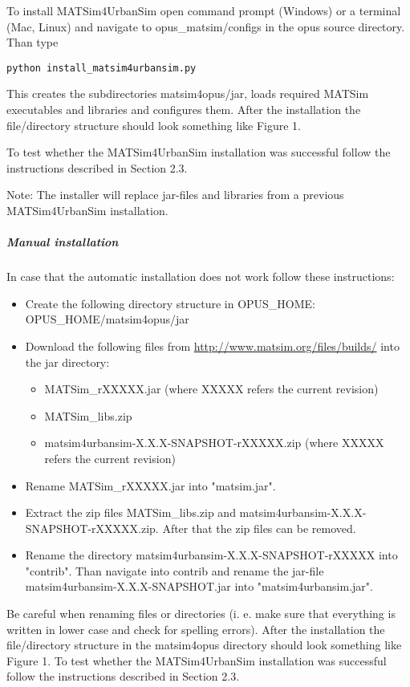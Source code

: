 To install MATSim4UrbanSim open command prompt (Windows) or a  terminal (Mac, Linux) and navigate to opus\_matsim/configs in the opus  source directory. Than type


\texttt{python install\_matsim4urbansim.py}

This creates the subdirectories matsim4opus/jar, loads required  MATSim executables and libraries and configures them. After the  installation the file/directory structure should look something like  Figure 1.

To test whether the MATSim4UrbanSim installation was successful follow the instructions described in Section 2.3.

Note: The installer will replace jar-files and libraries from a previous MATSim4UrbanSim installation.

\subparagraph{Manual installation}

In case that the automatic installation does not work follow these instructions:
\begin{itemize}
	\item Create the following directory structure in OPUS\_HOME: OPUS\_HOME/matsim4opus/jar
	\item Download the following files from \href{http://www.matsim.org/files/builds/}{http://www.matsim.org/files/builds/} into the jar directory:   
\begin{itemize}
	\item MATSim\_rXXXXX.jar (where XXXXX refers the current revision)
	\item MATSim\_libs.zip
	\item matsim4urbansim-X.X.X-SNAPSHOT-rXXXXX.zip (where XXXXX refers the current revision)
\end{itemize}
	\item Rename MATSim\_rXXXXX.jar into "matsim.jar".
	\item Extract the zip files MATSim\_libs.zip and matsim4urbansim-X.X.X-SNAPSHOT-rXXXXX.zip. After that the zip files can be removed.
	\item Rename the directory matsim4urbansim-X.X.X-SNAPSHOT-rXXXXX into  "contrib". Than navigate into contrib and rename the jar-file  matsim4urbansim-X.X.X-SNAPSHOT.jar into "matsim4urbansim.jar".
\end{itemize}

Be careful when renaming files or directories (i. e. make sure  that everything is written in lower case and check for spelling errors).  After the installation the file/directory structure in the matsim4opus  directory should look something like Figure 1. To test whether the  MATSim4UrbanSim installation was successful follow the instructions  described in Section 2.3.

